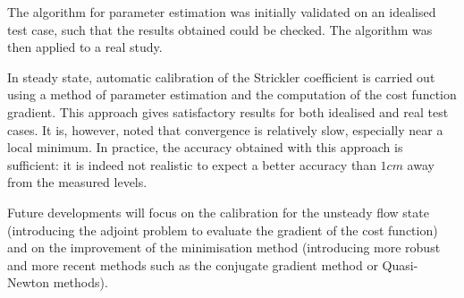 The algorithm for parameter estimation was initially validated on an idealised test case, such that the results obtained could be checked. The algorithm was then applied to a real study.

In steady state, automatic calibration of the Strickler coefficient is carried out using a method of parameter estimation and the computation of the cost function gradient. This approach gives satisfactory results for both idealised and real test cases. It is, however, noted that convergence is relatively slow, especially near a local minimum. In practice, the accuracy obtained with this approach is sufficient: it is indeed not realistic to expect a better accuracy than $1cm$ away from the measured levels.

Future developments will focus on the calibration for the unsteady flow state (introducing the adjoint problem to evaluate the gradient of the cost function) and on the improvement of the minimisation method (introducing more robust and more recent methods such as the conjugate gradient method or Quasi-Newton methods).

